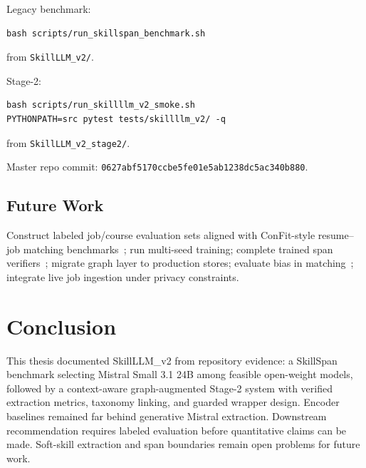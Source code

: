\documentclass[12pt,oneside]{report}
\begin{document}
Legacy benchmark:
\begin{verbatim}
bash scripts/run_skillspan_benchmark.sh
\end{verbatim}
from \texttt{SkillLLM\_v2/}.

Stage-2:
\begin{verbatim}
bash scripts/run_skillllm_v2_smoke.sh
PYTHONPATH=src pytest tests/skillllm_v2/ -q
\end{verbatim}
from \texttt{SkillLLM\_v2\_stage2/}.

Master repo commit: \texttt{0627abf5170ccbe5fe01e5ab1238dc5ac340b880}.

\section{Future Work}

Construct labeled job/course evaluation sets aligned with ConFit-style resume--job matching benchmarks~\cite{yu2025confitv2,vaishampayan2025humanllm}; run multi-seed training; complete trained span verifiers~\cite{ma2023llminformationextractor}; migrate graph layer to production stores; evaluate bias in matching~\cite{iso2025bias}; integrate live job ingestion under privacy constraints.

\chapter{Conclusion}
\label{ch:concl}

This thesis documented SkillLLM\_v2 from repository evidence: a SkillSpan benchmark selecting Mistral Small 3.1 24B among feasible open-weight models, followed by a context-aware graph-augmented Stage-2 system with verified extraction metrics, taxonomy linking, and guarded wrapper design.
Encoder baselines remained far behind generative Mistral extraction.
Downstream recommendation requires labeled evaluation before quantitative claims can be made.
Soft-skill extraction and span boundaries remain open problems for future work.



\end{document}
